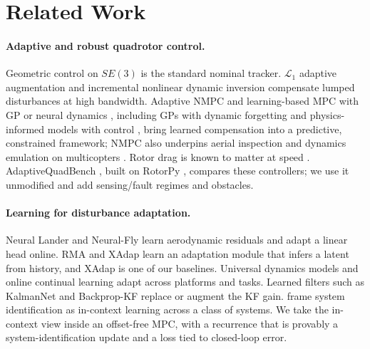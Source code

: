 \section{Related Work}
\label{sec:related}

\paragraph{Adaptive and robust quadrotor control.}
Geometric control on $SE(3)$ \citep{lee2010geometric} is the standard nominal tracker. $\mathcal{L}_1$ adaptive augmentation \citep{hovakimyan2010l1,wu2023l1quad} and incremental nonlinear dynamic inversion \citep{smeur2016adaptive,tal2021accurate} compensate lumped disturbances at high bandwidth.
Adaptive NMPC \citep{hanover2022performance} and learning-based MPC with GP or neural dynamics \citep{torrente2021data,chee2022knode,saviolo2022pitcn,salzmann2023neuralmpc,bauersfeld2021neurobem,saviolo2024active,scampicchio2025gaussian}, including GPs with dynamic forgetting \citep{amer2025gp} and physics-informed models with control \citep{amer2025pinc}, bring learned compensation into a predictive, constrained framework; NMPC also underpins aerial inspection \citep{amer2023visual} and dynamics emulation on multicopters \citep{amer2026dynamic}. Rotor drag is known to matter at speed \citep{faessler2018differential,sun2022comparative}.
AdaptiveQuadBench \citep{zhang2025adaptivequadbench}, built on RotorPy \citep{folk2023rotorpy}, compares these controllers; we use it unmodified and add sensing/fault regimes and obstacles.

\paragraph{Learning for disturbance adaptation.}
Neural Lander \citep{shi2019neural} and Neural-Fly \citep{oconnell2022neuralfly} learn aerodynamic residuals and adapt a linear head online. RMA \citep{kumar2021rma} and XAdap \citep{zhang2024xadap} learn an adaptation module that infers a latent from history, and XAdap is one of our baselines.
Universal dynamics models \citep{xiao2025anycar} and online continual learning \citep{sarabakha2023online} adapt across platforms and tasks. Learned filters such as KalmanNet \citep{revach2022kalmannet} and Backprop-KF \citep{haarnoja2016backprop} replace or augment the KF gain. \citet{forgione2023incontext} frame system identification as in-context learning across a class of systems.
We take the in-context view inside an offset-free MPC, with a recurrence that is provably a system-identification update and a loss tied to closed-loop error.

